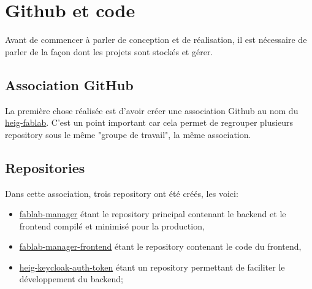 \documentclass[
    iai, %
    il, %
]{heig-tb}
\begin{document}




\chapter{Github et code}
Avant de commencer à parler de conception et de réalisation, il est nécessaire de parler de la façon dont les projets sont stockés et gérer.

\section{Association GitHub}
La première chose réalisée est d'avoir créer une association Github au nom du \href{https://github.com/heig-fablab}{heig-fablab}. C'est un point important car cela permet de regrouper plusieurs \Gls{repository} sous le même "groupe de travail", la même association.

\section{Repositories}
Dans cette association, trois \Gls{repository} ont été créés, les voici:
\begin{itemize}
    \item \href{https://github.com/heig-fablab/fablab-manager}{fablab-manager} étant le \Gls{repository} principal contenant le \Gls{backend} et le \Gls{frontend} compilé et minimisé pour la production,
    \item \href{https://github.com/heig-fablab/fablab-manager-frontend}{fablab-manager-frontend} étant le \Gls{repository} contenant le code du {frontend},
    \item \href{https://github.com/heig-fablab/heig-keycloak-auth-token}{heig-keycloak-auth-token} étant un \Gls{repository} permettant de faciliter le développement du \Gls{backend};
\end{itemize}
\end{document}
